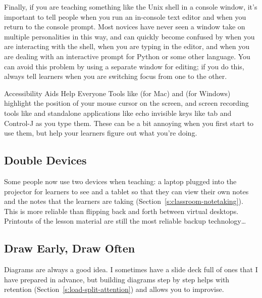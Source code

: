 Finally,
if you are teaching something like the Unix shell in a console window,
it's important to tell people when you run an in-console text editor
and when you return to the console prompt.
Most novices have never seen a window take on multiple personalities in this way,
and can quickly become confused by
when you are interacting with the shell,
when you are typing in the editor,
and when you are dealing with an interactive prompt for Python or some other language.
You can avoid this problem by using a separate window for editing;
if you do this,
always tell learners when you are switching focus from one to the other.

\begin{aside}{Accessibility Aids Help Everyone}
  Tools like  (for Mac)
  and  (for Windows)
  highlight the position of your mouse cursor on the screen,
  and screen recording tools like 
  and standalone applications like 
  echo invisible keys like tab and Control-J as you type them.
  These can be a bit annoying when you first start to use them,
  but help your learners figure out what you're doing.
\end{aside}

\subsection*{Double Devices}

Some people now use two devices when teaching:
a laptop plugged into the projector for learners to see
and a tablet so that they can view their own notes
and the notes that the learners are taking (Section~\ref{s:classroom-notetaking}).
This is more reliable than flipping back and forth between virtual desktops.
Printouts of the lesson material are still the most reliable backup technology{\ldots}

\subsection*{Draw Early, Draw Often}

Diagrams are always a good idea.
I sometimes have a slide deck full of ones that I have prepared in advance,
but building diagrams step by step helps with retention (Section~\ref{s:load-split-attention})
and allows you to improvise.

